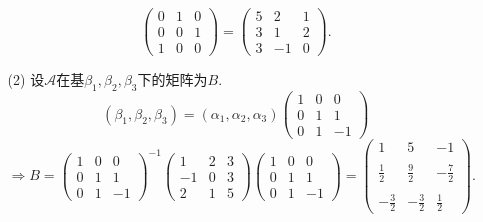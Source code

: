\documentclass{article}
\begin{document}
\begin{enumerate}
\begin{enumerate}
\[            \begin{pmatrix}
                0 & 1 & 0\\
                0 & 0 & 1\\
                1 & 0 & 0
            \end{pmatrix}
            =
            \begin{pmatrix}
                5 & 2 & 1\\
                3 & 1 & 2\\
                3 & -1 & 0
            \end{pmatrix}.
        \]
        \item [(2)]设$\mathcal{A}$在基$\beta_1,\beta_2,\beta_3$下的矩阵为$B$.
        \[
            (\beta_1,\beta_2,\beta_3)=(\alpha_1,\alpha_2,\alpha_3)
            \begin{pmatrix}
                1 & 0 & 0\\
                0 & 1 & 1\\
                0 & 1 & -1
            \end{pmatrix}
        \]
        \[
            \Rightarrow
            B=
            {\begin{pmatrix}
                1 & 0 & 0\\
                0 & 1 & 1\\
                0 & 1 & -1
            \end{pmatrix}}^{-1}
            \begin{pmatrix}
                1 & 2 & 3\\
                -1 & 0 & 3\\
                2 & 1 & 5
            \end{pmatrix}
            \begin{pmatrix}
                1 & 0 & 0\\
                0 & 1 & 1\\
                0 & 1 & -1
            \end{pmatrix}
            =\begin{pmatrix}
                1 & 5 & -1\\
                & &\\
                \displaystyle{\frac{1}{2}} & \displaystyle{\frac{9}{2}} & -\displaystyle{\frac{7}{2}}\\
                & &\\
                -\displaystyle{\frac{3}{2}} & -\displaystyle{\frac{3}{2}} & \displaystyle{\frac{1}{2}}
            \end{pmatrix}.
\]
\end{enumerate}
\end{enumerate}
\end{document}
